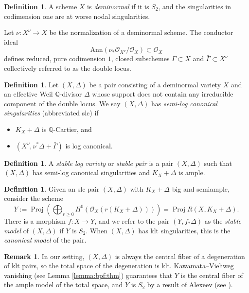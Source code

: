 \documentclass[11pt]{amsart}
\theoremstyle{definition}
\newtheorem{definition}[theorem]{Definition}
\newtheorem{remark}[theorem]{Remark}
\theoremstyle{remark}
\newcommand{\calO}{\mathcal O}
\newcommand{\Proj}{\operatorname{Proj}}
\begin{document}
	\begin{definition}\label{def:deminormal}A scheme $X$ is \emph{deminormal} if it is $S_2$, and the singularities in codimension one are at worse nodal singularities.
	\end{definition}
	
	Let $\nu : X^{\nu} \to X$ be the normalization of a deminormal scheme. The conductor ideal
	$$
	\mathrm{Ann}(\nu_*\calO_{X^\nu}/\calO_X) \subset \calO_X
	$$
	defines reduced, pure codimension $1$, closed subschemes $\Gamma \subset X$ and $\bar{\Gamma} \subset X^\nu$ collectively referred to as the double locus. 
	
	\begin{definition}\label{def:slc} Let $(X,\Delta)$ be a pair consisting of a deminormal variety $X$ and an effective Weil $\mathbb{Q}$-divisor $\Delta$ whose support does not contain any irreducible component of the double locus. We say $(X,\Delta)$ has \emph{semi-log canonical singularities} (abbreviated slc) if
		\begin{itemize}
			\item $K_X + \Delta$ is $\mathbb{Q}$-Cartier, and
			\item $(X^\nu, \nu^*\Delta + \bar{\Gamma})$ is log canonical. 
		\end{itemize}
		
	\end{definition}
	
	\begin{definition} A \emph{stable log variety} or \emph{stable pair} is a pair $(X, \Delta)$ such that $(X,\Delta)$ has semi-log canonical singularities and $K_X + \Delta$ is ample. 
	\end{definition}
	
	\begin{definition}\label{def:stable:model}
		Given an slc pair $(X,\Delta)$ with $K_X+\Delta$ big and semiample, consider the scheme 
		$$
		Y:=\Proj(\bigoplus_{r \ge 0} H^0(\calO_X(r(K_X+\Delta)))) = \Proj R(X, K_X + \Delta).
		$$ There is a morphism $f:X \to Y$, and we refer to the pair $(Y,f_*\Delta)$ as the \emph{stable model} of $(X,\Delta)$ if $Y$ is $S_2$. When $(X,\Delta)$ has klt singularities, this is the \emph{canonical model} of the pair. 
	\end{definition}
	
	\begin{remark} In our setting, $(X,\Delta)$ is always the central fiber of a degeneration of klt pairs, so the total space of the degeneration is klt. Kawamata--Viehweg vanishing (see Lemma \ref{lemma:bpf:thm}) guarantees that $Y$ is the central fiber of the ample model of the total space, and $Y$ is $S_2$ by a result of Alexeev (see \cite[Theorem 0.1]{AlexeevLimit}). \end{remark}
	
\end{document}

